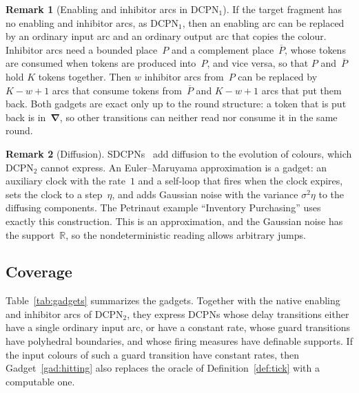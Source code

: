 \documentclass[11pt]{article}
\theoremstyle{definition}
\newcommand{\Real}{\mathbb{R}}
\newcommand{\bfNabla}{\boldsymbol{\nabla}}
\newcommand{\DCPN}[1]{\texorpdfstring{\textup{DCPN}\ensuremath{_{#1}}}{DCPN#1}}
\newtheorem{remark}{Remark}
\begin{document}
\begin{remark}[Enabling and inhibitor arcs in \DCPN{1}]
  If the target fragment has no enabling and inhibitor arcs, as \DCPN{1},
  then an enabling arc can be replaced by an ordinary input arc and an
  ordinary output arc that copies the colour. Inhibitor arcs need a bounded
  place~$P$ and a complement place~$\overline{P}$, whose tokens are consumed
  when tokens are produced into~$P$, and vice versa, so that $P$
  and~$\overline{P}$ hold $K$ tokens together. Then $w$ inhibitor arcs
  from~$P$ can be replaced by $K - w + 1$ arcs that consume tokens
  from~$\overline{P}$ and $K - w + 1$ arcs that put them back. Both gadgets
  are exact only up to the round
  structure: a token that is put back is in~$\bfNabla$, so other transitions
  can neither read nor consume it in the same round.
\end{remark}

\begin{remark}[Diffusion]
  SDCPNs~\cite{EverdijBlom2006} add diffusion to the evolution of colours,
  which \DCPN{2} cannot express. An Euler--Maruyama approximation is a
  gadget: an auxiliary clock with the rate~$1$ and a self-loop that fires when
  the clock expires, sets the clock to a step~$\eta$, and adds Gaussian noise
  with the variance $\sigma^2 \eta$ to the diffusing components. The Petrinaut
  example ``Inventory Purchasing'' uses exactly this construction. This is an
  approximation, and the Gaussian noise has the support~$\Real$, so the
  nondeterministic reading allows arbitrary jumps.
\end{remark}

\subsection{Coverage}

Table~\ref{tab:gadgets} summarizes the gadgets. Together with the native
enabling and inhibitor arcs of \DCPN{2}, they express DCPNs whose delay
transitions either have a single ordinary input arc, or have a constant rate,
whose guard transitions have polyhedral boundaries, and whose firing measures
have definable supports. If the input colours of such a guard transition have
constant rates, then Gadget~\ref{gad:hitting} also replaces the oracle of
Definition~\ref{def:tick} with a computable one.
\end{document}

